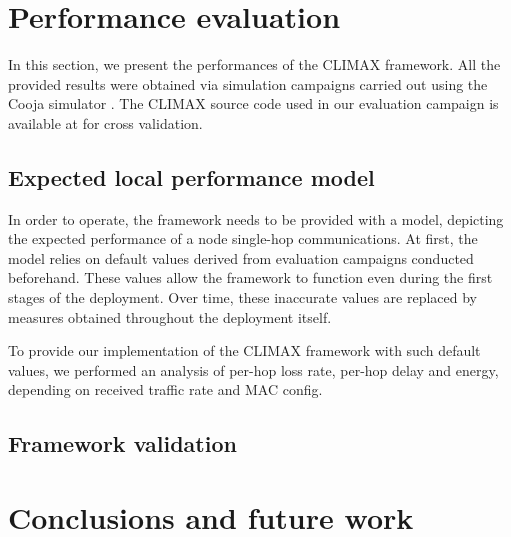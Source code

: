 \documentclass[12pt,journal,compsoc]{IEEEtran}
\begin{document}
\section{Performance evaluation}
\label{results}

In this section, we present the performances of the CLIMAX framework. All the provided results were obtained via simulation campaigns carried out using the Cooja simulator \cite{?}.
The CLIMAX source code used in our evaluation campaign is available at \cite{?} for cross validation.

\subsection{Expected local performance model}

In order to operate, the framework needs to be provided with a model, depicting the expected performance of a node single-hop communications. At first, the model relies on default values derived from evaluation campaigns conducted beforehand. These values allow the framework to function even during the first stages of the deployment. Over time, these inaccurate values are replaced by measures obtained throughout the deployment itself.

To provide our implementation of the CLIMAX framework with such default values, we performed an analysis of per-hop loss rate, per-hop delay and energy, depending on received traffic rate and MAC config.

\subsection{Framework validation}


\section{Conclusions and future work}
\label{ccl}





%

%

\end{document}
